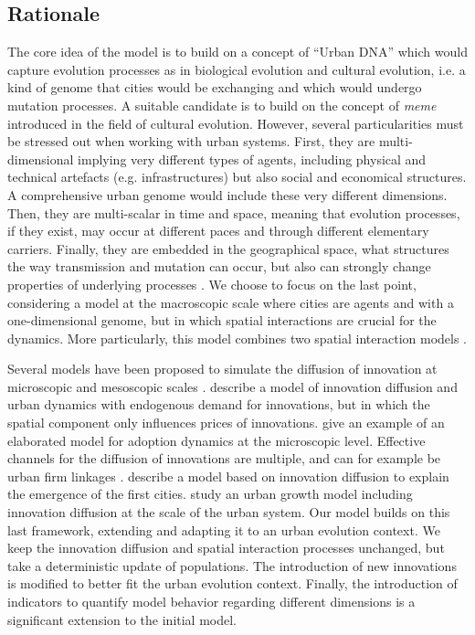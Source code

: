 \documentclass[letterpaper]{article}
\begin{document}
\subsection{Rationale}

The core idea of the model is to build on a concept of ``Urban DNA'' which would capture evolution processes as in biological evolution and cultural evolution, i.e. a kind of genome that cities would be exchanging and which would undergo mutation processes. A suitable candidate is to build on the concept of \emph{meme} introduced in the field of cultural evolution. However, several particularities must be stressed out when working with urban systems. First, they are multi-dimensional implying very different types of agents, including physical and technical artefacts (e.g. infrastructures) but also social and economical structures. A comprehensive urban genome would include these very different dimensions. Then, they are multi-scalar in time and space, meaning that evolution processes, if they exist, may occur at different paces and through different elementary carriers. Finally, they are embedded in the geographical space, what structures the way transmission and mutation can occur, but also can strongly change properties of underlying processes \citep{raimbault2019space}. We choose to focus on the last point, considering a model at the macroscopic scale where cities are agents and with a one-dimensional genome, but in which spatial interactions are crucial for the dynamics. More particularly, this model combines two spatial interaction models \citep{fotheringham1989spatial}.


Several models have been proposed to simulate the diffusion of innovation at microscopic and mesoscopic scales \citep{kiesling2012agent}. \cite{blommestein1987adoption} describe a model of innovation diffusion and urban dynamics with endogenous demand for innovations, but in which the spatial component only influences prices of innovations. \cite{deffuant2005individual} give an example of an elaborated model for adoption dynamics at the microscopic level. Effective channels for the diffusion of innovations are multiple, and can for example be urban firm linkages \citep{rozenblat2007firm}. \cite{pumain2017simpoplocal} describe a model based on innovation diffusion to explain the emergence of the first cities. \cite{favaro2011gibrat} study an urban growth model including innovation diffusion at the scale of the urban system. Our model builds on this last framework, extending and adapting it to an urban evolution context. We keep the innovation diffusion and spatial interaction processes unchanged, but take a deterministic update of populations. The introduction of new innovations is modified to better fit the urban evolution context. Finally, the introduction of indicators to quantify model behavior regarding different dimensions is a significant extension to the initial model.
\end{document}
